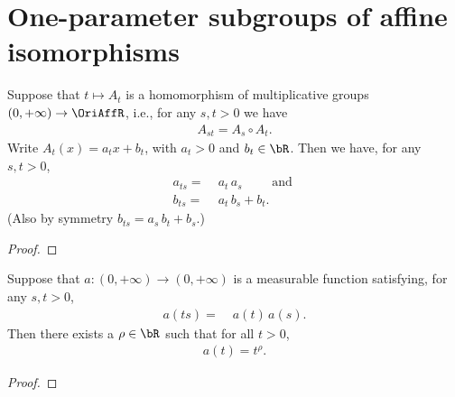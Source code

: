\chapter{One-parameter subgroups of affine isomorphisms}



\begin{lemma}
  \label{lem:affine-one-parameter-subgroup-functional-eqn}
  Suppose that $t \mapsto A_t$ is a homomorphism of multiplicative groups
  $(0,+\infty) \to \OriAffR$, i.e., for any $s, t > 0$ we have
  \begin{align*}
    A_{s t} = A_s \circ A_t .
  \end{align*}
  Write $A_t(x) = a_t x + b_t$, with $a_t > 0$ and $b_t \in \bR$.
  Then we have, for any $s, t > 0$,
  \begin{align*}
    a_{t s} = \; & a_t \, a_s
      \qquad \text{ and } \\
    b_{t s} = \; & a_t \, b_s + b_t .
  \end{align*}
  (Also by symmetry $b_{t s} = a_s \, b_t + b_s$.)
\end{lemma}
\begin{proof}
\end{proof}

\begin{lemma}
  \label{lem:solution-functional-eqn-scaling}
  \leanok
  Suppose that $a \colon (0,+\infty) \to (0,+\infty)$ is a
  measurable function satisfying, for any $s, t > 0$,
  \begin{align*}
    a(t s) = \; & a(t) \, a(s) .
  \end{align*}
  Then there exists a $\rho \in \bR$ such that for all $t > 0$,
  \begin{align*}
    a(t) = t^{\rho} .
  \end{align*}
\end{lemma}
\begin{proof}
\end{proof}

